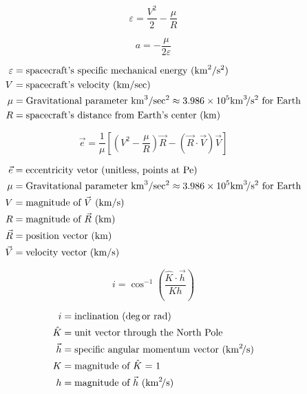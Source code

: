 \documentclass{article}
\newcommand{\myvarmukm}{\mu &= \text{Gravitational parameter \si{\kilo\meter\cubed\per\sec\squared}} \approx 3.986 \times 10^5 \si{\kilo\meter\cubed\per\second\squared} \text{ for Earth}}
\newcommand{\myvarv}{V &= \text{spacecraft's velocity (\si{\kilo\meter\per\sec})}}
\newcommand{\myvarepsilon}{\varepsilon &= \text{spacecraft's specific mechanical energy (\si{\kilo\meter\squared\per\second\squared)}}}
\begin{document}
\begin{multicols}{3}
\begin{equation*}
\boxed{\varepsilon = \dfrac{V^2}{2} - \dfrac{\mu}{R}}
\end{equation*}

\begin{equation*}
\boxed{a = - \dfrac{\mu}{2 \varepsilon}}
\end{equation*}

\vfill\null
\columnbreak

\begin{align*}
\myvarepsilon\\
\myvarv\\
\myvarmukm \\
R &= \text{spacecraft's distance from Earth's center (\si{\kilo\meter})}\\
\end{align*}
\end{multicols}

\begin{multicols}{3}
	\begin{equation*}
	\boxed{\vec{e} = \dfrac{1}{\mu}\left[\left(V^2 - \dfrac{\mu}{R}\right)\vec{R} - (\vec{R}\cdot\vec{V})\vec{V}\right]}
	\end{equation*}

	\vfill\null
	\columnbreak

	\begin{align*}
	\vec{e} &= \text{eccentricity vetor (unitless, points at Pe)}\\
	\myvarmukm \\
	V &= \text{magnitude of $\vec{V}$ (\si{\kilo\meter\per\second})}\\
	R &= \text{magnitude of $\vec{R}$ (\si{\kilo\meter})}\\
	\vec{R} &= \text{position vector (\si{\kilo\meter})}\\
	\vec{V} &= \text{velocity vector (\si{\kilo\meter\per\second})}\\
	\end{align*}
\end{multicols}

\begin{multicols}{3}
	\begin{equation*}
	\boxed{i = \cos^{-1}\left(\dfrac{\hat{K} \cdot \vec{h}}{K h}\right)}
	\end{equation*}

	\vfill\null
	\columnbreak

	\begin{align*}
	i &= \text{inclination (\si{\deg \text{or } \radian})}\\
	\hat{K} &= \text{unit vector through the North Pole}\\
	\vec{h} &= \text{specific angular momentum vector (\si{\kilo\meter\squared\per\second})}\\
	K &= \text{magnitude of $\hat{K}$ = 1}\\
	h &= \text{magnitude of $\vec{h}$ (\si{\kilo\meter\squared\per\second})}\\
	\end{align*}
\end{multicols}
\end{document}
